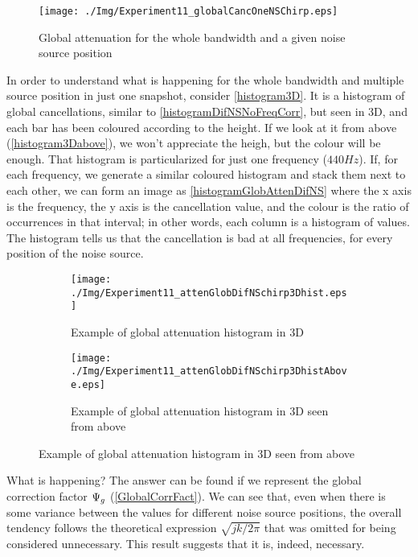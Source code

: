 \begin{figure}[h]
	\centering
	\texttt{[image: ./Img/Experiment11\_globalCancOneNSChirp.eps]}
	\caption{Global attenuation for the whole bandwidth and a given noise source position}
	\label{globCancOneNSchirp}
\end{figure}

In order to understand what is happening for the whole bandwidth and multiple source position in just one snapshot, consider \autoref{histogram3D}. It is a histogram of global cancellations, similar to \autoref{histogramDifNSNoFreqCorr}, but seen in 3D, and each bar has been coloured according to the height. If we look at it from above (\autoref{histogram3Dabove}), we won't appreciate the heigh, but the colour will be enough.
That histogram is particularized for just one frequency ($440\si{Hz}$). If, for each frequency, we generate a similar coloured histogram and stack them next to each other, we can form an image as \autoref{histogramGlobAttenDifNS} where the x axis is the frequency, the y axis is the cancellation value, and the colour is the ratio of occurrences in that interval; in other words, each column is a histogram of values. The histogram tells us that the cancellation is bad at all frequencies, for every position of the noise source.

\begin{figure}[h]
	\begin{subfigure}[b]{0.49\textwidth}
	\centering
	\texttt{[image: ./Img/Experiment11\_attenGlobDifNSchirp3Dhist.eps]}
	\caption{Example of global attenuation histogram in 3D}
	\label{histogram3D}
	\end{subfigure}
	\begin{subfigure}[b]{0.49\textwidth}
		\centering
		\texttt{[image: ./Img/Experiment11\_attenGlobDifNSchirp3DhistAbove.eps]}
		\caption{Example of global attenuation histogram in 3D seen from above}
		\label{histogram3Dabove}
	\end{subfigure}
\end{figure}

What is happening? The answer can be found if we represent the global correction factor $\Psi_g$ (\autoref{GlobalCorrFact}). We can see that, even when there is some variance between the values for different noise source positions, the overall tendency follows the theoretical expression $\sqrt{jk/2\pi}$ that was omitted for being considered unnecessary. This result suggests that it is, indeed, necessary.

